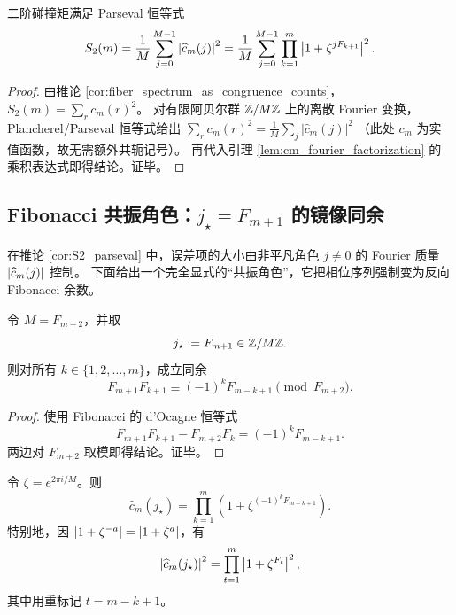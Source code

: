\begin{corollary}\label{cor:S2_parseval}
\MathTag
二阶碰撞矩满足 Parseval 恒等式
$$
S_2(m)=\frac{1}{M}\sum_{j=0}^{M-1}\left\lvert \widehat c_m(j)\right\rvert^2
=\frac{1}{M}\sum_{j=0}^{M-1}\prod_{k=1}^{m}\left|1+\zeta^{jF_{k+1}}\right|^2.
$$
\end{corollary}

\begin{proof}
\MathTag
由推论 \ref{cor:fiber_spectrum_as_congruence_counts}，$S_2(m)=\sum_r c_m(r)^2$。
对有限阿贝尔群 $\mathbb{Z}/M\mathbb{Z}$ 上的离散 Fourier 变换，Plancherel/Parseval 恒等式给出
$
\sum_r c_m(r)^2=\frac{1}{M}\sum_j |\widehat c_m(j)|^2
$
（此处 $c_m$ 为实值函数，故无需额外共轭记号）。
再代入引理 \ref{lem:cm_fourier_factorization} 的乘积表达式即得结论。证毕。
\end{proof}

\subsection{Fibonacci 共振角色：\texorpdfstring{$j_\star=F_{m+1}$}{j*=F(m+1)} 的镜像同余}
\MathTag
在推论 \ref{cor:S2_parseval} 中，误差项的大小由非平凡角色 $j\neq 0$ 的 Fourier 质量 $\left\lvert \widehat c_m(j)\right\rvert$ 控制。
下面给出一个完全显式的“共振角色”，它把相位序列强制变为反向 Fibonacci 余数。

\begin{lemma}[镜像共振同余]\label{lem:fib_resonant_congruence}
\MathTag
令 $M=F_{m+2}$，并取
$$
j_\star:=F_{m+1}\in\mathbb{Z}/M\mathbb{Z}.
$$
则对所有 $k\in\{1,2,\dots,m\}$，成立同余
$$
F_{m+1}F_{k+1}\equiv (-1)^k F_{m-k+1}\pmod{F_{m+2}}.
$$
\end{lemma}

\begin{proof}
\MathTag
使用 Fibonacci 的 d'Ocagne 恒等式
$$
F_{m+1}F_{k+1}-F_{m+2}F_k = (-1)^k F_{m-k+1}.
$$
两边对 $F_{m+2}$ 取模即得结论。证毕。
\end{proof}

\begin{corollary}[共振角色的闭式相位表达]\label{cor:resonant_phase_reversal}
\MathTag
令 $\zeta=e^{2\pi i/M}$。则
$$
\widehat c_m(j_\star)
=\prod_{k=1}^{m}\left(1+\zeta^{(-1)^kF_{m-k+1}}\right).
$$
特别地，因 $\left\lvert 1+\zeta^{-a}\right\rvert=\left\lvert 1+\zeta^{a}\right\rvert$，有
$$
\left\lvert \widehat c_m(j_\star)\right\rvert^2=\prod_{t=1}^{m}\left|1+\zeta^{F_t}\right|^2,
$$
其中用重标记 $t=m-k+1$。
\end{corollary}
